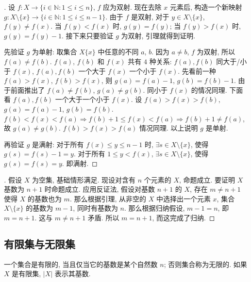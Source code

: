 \documentclass[UTF8]{ctexart}
\theoremstyle{mystyle}
\theoremstyle{myremark}
\theoremstyle{plain}
\newcommand{\N}{\mathbb N}
\newcommand{\set}[1]{\{#1\}}
\begin{document}
\begin{proof}[]
    设 $ f \colon X \to \set{i \in \N \colon 1 \leqslant i \leqslant n} $, $ f $ 应为双射. 现在去除 $ x $ 元素后, 构造一个新映射 $ g \colon X \setminus \set x \to \set{i \in \N \colon 1 \leqslant i \leqslant n - 1} $. 由于 $ f $ 是双射, 对于 $ y \in X \setminus \set x $, $ f(y) \neq f(x) $. 当 $ f(y) < f(x) $ 时, $ g(y) = f(y) $; 当 $ f(y) > f(x) $ 时, $ g(y) = f(y) - 1 $. 接下来只要验证 $ g $ 为双射, 引理就得到证明. 
    
    先验证 $ g $ 为单射: 取集合 $ X \set{x} $ 中任意的不同 $ a $, $ b $. 因为 $ a \neq b $, $ f $ 为双射, 所以 $ f(a) \neq f(b) $. $ f(a) $, $ f(b) $ 和 $ f(x) $ 共有 $ 4 $ 种关系: $ f(a), f(b) $ 同大于/小于 $ f(x) $, $ f(a), f(b) $ 一个大于 $ f(x) $ 一个小于 $ f(x) $. 先看前一种 $ f(a) > f(x) $, $ f(b) > f(x) $, 则 $ g(a) = f(a) - 1 $, $ g(b) = f(b) - 1 $. 由于前面推出了 $ f(a) \neq f(b) $, $ g(a) \neq g(b) $. 同小于 $ f(x) $ 的情况同理. 下面看 $ f(a), f(b) $ 一个大于一个小于 $ f(x) $. 设 $ f(a) > f(x) > f(b) $, $ g(a) = f(a) - 1 $, $ g(b) = f(b) $. $ f(b) < f(x) < f(a) \Longrightarrow f(b) + 1 \leqslant f(x) < f(a) \Longrightarrow f(b) + 1 \neq f(a) $, 故 $ g(a) \neq g(b) $. $ f(b) > f(x) > f(a) $ 情况同理. 以上说明 $ g $ 是单射.

    再验证 $ g $ 是满射: 对于所有 $ f(x) \leqslant y \leqslant n - 1 $ 时, $ \exists s \in X \setminus \set x $, 使得 $ g(s) = f(s) - 1 = y $. 对于所有 $ 1 \leqslant y < f(x) $, $ \exists s \in X \setminus \set x $, 使得 $ g(s) = f(s) = y $. 即满射.
\end{proof}


\begin{proof}[]
    假设 $ X $ 为空集, 基础情形满足. 现设对含有 $ n $ 个元素的 $ X $, 命题成立. 要证明 $ X $ 基数为 $ n + 1 $ 时命题成立. 应用反证法, 假设对基数 $ n + 1 $ 的 $ X $, 存在 $ m \neq n + 1 $ 使得 $ X $ 的基数也为 $ m $. 那么根据引理, 从非空的 $ X $ 中选择出一个元素 $ x $, 集合 $ X \setminus \set{x} $ 的基数为 $ m - 1 $, 同时有基数为 $ n $. 那么根据归纳假设, $ m - 1 = n $, 即 $ m = n + 1 $. 这与 $ m \neq n + 1 $ 矛盾. 所以 $ m = n + 1 $, 而这完成了归纳.
\end{proof}


\subsection{有限集与无限集}
\begin{definition}
    一个集合是有限的, 当且仅当它的基数是某个自然数 $ n $; 否则集合称为无限的. 如果 $ X $ 是有限集, $ |X| $ 表示其基数.
\end{definition}
\end{document}
